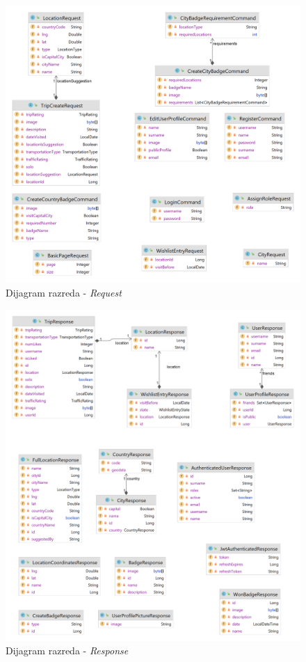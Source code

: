                \begin{figure}[H]
        			\includegraphics[scale=0.2]{slike/class/class_request.png}
        		\centering
        		\caption{Dijagram razreda - \textit{Request}}
        	\end{figure}

                \begin{figure}[H]
        			\includegraphics[scale=0.2]{slike/class/class_response.png}
        		\centering
        		\caption{Dijagram razreda - \textit{Response}}
        	\end{figure}
         \eject

